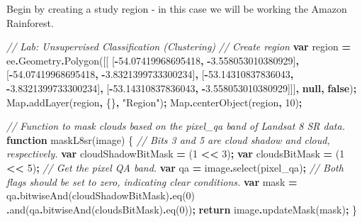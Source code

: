 \documentclass[
]{article}
\newenvironment{Shaded}{\begin{snugshade}}{\end{snugshade}}
\newcommand{\AttributeTok}[1]{\textcolor[rgb]{0.77,0.63,0.00}{#1}}
\newcommand{\BuiltInTok}[1]{#1}
\newcommand{\CommentTok}[1]{\textcolor[rgb]{0.56,0.35,0.01}{\textit{#1}}}
\newcommand{\ControlFlowTok}[1]{\textcolor[rgb]{0.13,0.29,0.53}{\textbf{#1}}}
\newcommand{\DecValTok}[1]{\textcolor[rgb]{0.00,0.00,0.81}{#1}}
\newcommand{\FloatTok}[1]{\textcolor[rgb]{0.00,0.00,0.81}{#1}}
\newcommand{\FunctionTok}[1]{\textcolor[rgb]{0.00,0.00,0.00}{#1}}
\newcommand{\KeywordTok}[1]{\textcolor[rgb]{0.13,0.29,0.53}{\textbf{#1}}}
\newcommand{\NormalTok}[1]{#1}
\newcommand{\OperatorTok}[1]{\textcolor[rgb]{0.81,0.36,0.00}{\textbf{#1}}}
\newcommand{\StringTok}[1]{\textcolor[rgb]{0.31,0.60,0.02}{#1}}
\begin{document}
Begin by creating a study region - in this case we will be working the Amazon Rainforest.

\begin{Shaded}
\begin{Highlighting}[]
\CommentTok{// Lab: Unsupervised Classification (Clustering)}
\CommentTok{// Create region}
\KeywordTok{var}\NormalTok{ region }\OperatorTok{=}\NormalTok{  ee}\OperatorTok{.}\AttributeTok{Geometry}\OperatorTok{.}\FunctionTok{Polygon}\NormalTok{([[}
\NormalTok{  [}\OperatorTok{{-}}\FloatTok{54.07419968695418}\OperatorTok{,} \OperatorTok{{-}}\FloatTok{3.558053010380929}\NormalTok{]}\OperatorTok{,}
\NormalTok{  [}\OperatorTok{{-}}\FloatTok{54.07419968695418}\OperatorTok{,} \OperatorTok{{-}}\FloatTok{3.8321399733300234}\NormalTok{]}\OperatorTok{,}
\NormalTok{  [}\OperatorTok{{-}}\FloatTok{53.14310837836043}\OperatorTok{,} \OperatorTok{{-}}\FloatTok{3.8321399733300234}\NormalTok{]}\OperatorTok{,}
\NormalTok{  [}\OperatorTok{{-}}\FloatTok{53.14310837836043}\OperatorTok{,} \OperatorTok{{-}}\FloatTok{3.558053010380929}\NormalTok{]]]}\OperatorTok{,} \KeywordTok{null}\OperatorTok{,} \KeywordTok{false}\NormalTok{)}\OperatorTok{;}
\BuiltInTok{Map}\OperatorTok{.}\FunctionTok{addLayer}\NormalTok{(region}\OperatorTok{,}\NormalTok{ \{\}}\OperatorTok{,} \StringTok{"Region"}\NormalTok{)}\OperatorTok{;}
\BuiltInTok{Map}\OperatorTok{.}\FunctionTok{centerObject}\NormalTok{(region}\OperatorTok{,} \DecValTok{10}\NormalTok{)}\OperatorTok{;}
\end{Highlighting}
\end{Shaded}

\begin{Shaded}
\begin{Highlighting}[]
\CommentTok{// Function to mask clouds based on the pixel\_qa band of Landsat 8 SR data.}
\KeywordTok{function} \FunctionTok{maskL8sr}\NormalTok{(image) \{}
\CommentTok{// Bits 3 and 5 are cloud shadow and cloud, respectively.}
        \KeywordTok{var}\NormalTok{ cloudShadowBitMask }\OperatorTok{=}\NormalTok{ (}\DecValTok{1} \OperatorTok{\textless{}\textless{}} \DecValTok{3}\NormalTok{)}\OperatorTok{;}
        \KeywordTok{var}\NormalTok{ cloudsBitMask }\OperatorTok{=}\NormalTok{ (}\DecValTok{1} \OperatorTok{\textless{}\textless{}} \DecValTok{5}\NormalTok{)}\OperatorTok{;}
        \CommentTok{// Get the pixel QA band.}
        \KeywordTok{var}\NormalTok{ qa }\OperatorTok{=}\NormalTok{ image}\OperatorTok{.}\FunctionTok{select}\NormalTok{(}\StringTok{\textquotesingle{}pixel\_qa\textquotesingle{}}\NormalTok{)}\OperatorTok{;}
        \CommentTok{// Both flags should be set to zero, indicating clear conditions.}
        \KeywordTok{var}\NormalTok{ mask }\OperatorTok{=}\NormalTok{ qa}\OperatorTok{.}\FunctionTok{bitwiseAnd}\NormalTok{(cloudShadowBitMask)}\OperatorTok{.}\FunctionTok{eq}\NormalTok{(}\DecValTok{0}\NormalTok{)}
                \OperatorTok{.}\FunctionTok{and}\NormalTok{(qa}\OperatorTok{.}\FunctionTok{bitwiseAnd}\NormalTok{(cloudsBitMask)}\OperatorTok{.}\FunctionTok{eq}\NormalTok{(}\DecValTok{0}\NormalTok{))}\OperatorTok{;}
           \ControlFlowTok{return}\NormalTok{ image}\OperatorTok{.}\FunctionTok{updateMask}\NormalTok{(mask)}\OperatorTok{;}
\NormalTok{\}}
\end{Highlighting}
\end{Shaded}
\end{document}
